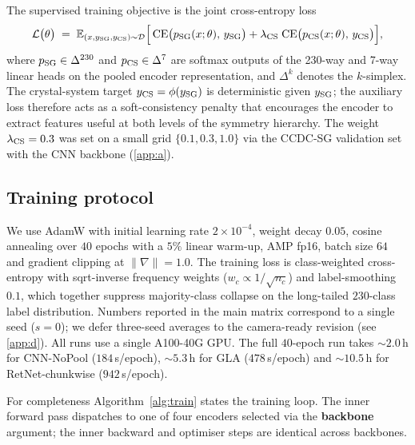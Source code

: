 \documentclass[final]{ws-ijwmip}
\begin{document}
The supervised training objective is the joint cross-entropy loss
\begin{equation}
\mathcal{L}\bigl(\theta\bigr) \;=\; \mathbb{E}_{(x, y_{\rm SG}, y_{\rm CS})\sim\mathcal{D}}
  \Bigl[\,
  \mathrm{CE}\bigl(p_{\rm SG}(x;\theta),\, y_{\rm SG}\bigr)
  + \lambda_{\rm CS}\;\mathrm{CE}\bigl(p_{\rm CS}(x;\theta),\, y_{\rm CS}\bigr)
  \Bigr],
\label{eq:loss}
\end{equation}
where $p_{\rm SG}\in\Delta^{230}$ and $p_{\rm CS}\in\Delta^{7}$ are
softmax outputs of the 230-way and 7-way linear heads on the pooled
encoder representation, and $\Delta^k$ denotes the $k$-simplex.
The crystal-system target $y_{\rm CS} = \phi(y_{\rm SG})$ is deterministic
given $y_{\rm SG}$; the auxiliary loss therefore acts as a
soft-consistency penalty that encourages the encoder to extract features
useful at both levels of the symmetry hierarchy. The weight
$\lambda_{\rm CS}=0.3$ was set on a small grid $\{0.1, 0.3, 1.0\}$ via
the CCDC-SG validation set with the CNN backbone (\ref{app:a}).


\subsection{Training protocol}

We use AdamW with initial learning rate $2\times 10^{-4}$, weight
decay $0.05$, cosine annealing over $40$ epochs with a $5\%$ linear
warm-up, AMP fp16, batch size $64$ and gradient clipping at
$\|\nabla\|=1.0$. The training loss is class-weighted cross-entropy
with sqrt-inverse frequency weights ($w_c\propto 1/\sqrt{n_c}$) and
label-smoothing $0.1$, which together suppress majority-class collapse
on the long-tailed $230$-class label distribution. Numbers reported in
the main matrix correspond to a single seed ($s\!=\!0$); we defer
three-seed averages to the camera-ready revision (see \ref{app:d}).
All runs use a single A100-40G GPU. The full $40$-epoch run takes
$\sim 2.0$\,h for CNN-NoPool ($184$\,s/epoch), $\sim 5.3$\,h for GLA
($478$\,s/epoch) and $\sim 10.5$\,h for RetNet-chunkwise
($942$\,s/epoch).

For completeness Algorithm~\ref{alg:train} states the training loop. The
inner forward pass dispatches to one of four encoders selected via the
\textbf{backbone} argument; the inner backward and optimiser steps are
identical across backbones.
\end{document}
